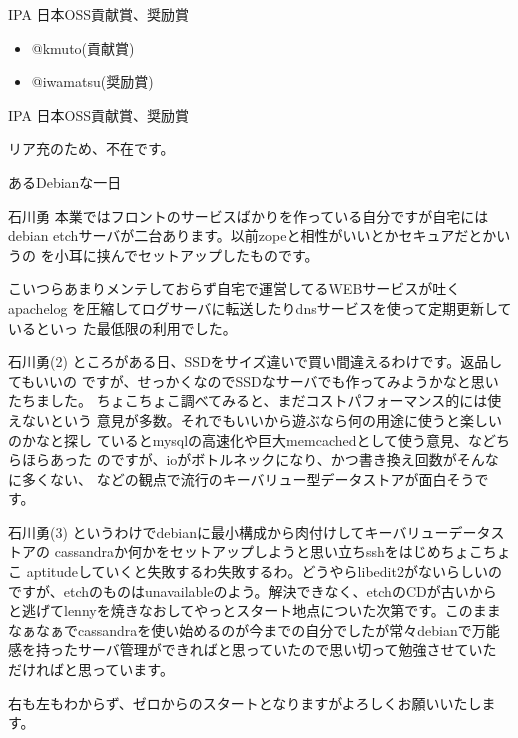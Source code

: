 \begin{frame}{IPA 日本OSS貢献賞、奨励賞}
\begin{itemize}
 \item @kmuto(貢献賞)
 \item @iwamatsu(奨励賞)
\end{itemize}
\end{frame}

\begin{frame}{IPA 日本OSS貢献賞、奨励賞}
\begin{center}
\Huge リア充のため、不在です。
\end{center}
\end{frame}

\begin{frame}{あるDebianな一日}

\end{frame}

\begin{frame}{石川勇}
 本業ではフロントのサービスばかりを作っている自分ですが自宅にはdebian
 etchサーバが二台あります。以前zopeと相性がいいとかセキュアだとかいうの
 を小耳に挟んでセットアップしたものです。

 こいつらあまりメンテしておらず自宅で運営してるWEBサービスが吐くapachelog
 を圧縮してログサーバに転送したりdnsサービスを使って定期更新しているといっ
 た最低限の利用でした。
\end{frame}

\begin{frame}{石川勇(2)}
 ところがある日、SSDをサイズ違いで買い間違えるわけです。返品してもいいの
 ですが、せっかくなのでSSDなサーバでも作ってみようかなと思いたちました。
 ちょこちょこ調べてみると、まだコストパフォーマンス的には使えないという
 意見が多数。それでもいいから遊ぶなら何の用途に使うと楽しいのかなと探し
 ているとmysqlの高速化や巨大memcachedとして使う意見、などちらほらあった
 のですが、ioがボトルネックになり、かつ書き換え回数がそんなに多くない、
 などの観点で流行のキーバリュー型データストアが面白そうです。
\end{frame}

\begin{frame}{石川勇(3)}
 というわけでdebianに最小構成から肉付けしてキーバリューデータストアの
 cassandraか何かをセットアップしようと思い立ちsshをはじめちょこちょこ
 aptitudeしていくと失敗するわ失敗するわ。どうやらlibedit2がないらしいの
 ですが、etchのものはunavailableのよう。解決できなく、etchのCDが古いから
 と逃げてlennyを焼きなおしてやっとスタート地点についた次第です。このまま
 なぁなぁでcassandraを使い始めるのが今までの自分でしたが常々debianで万能
 感を持ったサーバ管理ができればと思っていたので思い切って勉強させていた
 だければと思っています。

 右も左もわからず、ゼロからのスタートとなりますがよろしくお願いいたしま
 す。
\end{frame}

